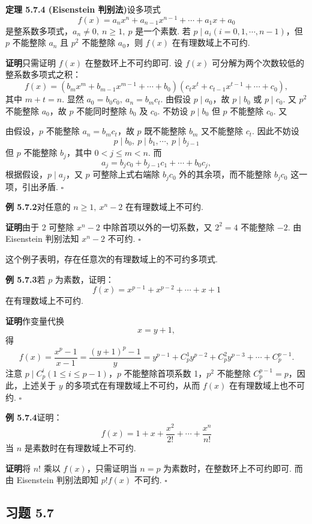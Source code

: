 \documentclass[UTF8,12pt,a4paper,fontset=fandol]{ctexart}
\begin{document}
\noindent\textbf{定理 5.7.4 (Eisenstein 判别法)}\quad 设多项式
\[
f(x)=a_nx^n+a_{n-1}x^{n-1}+\cdots+a_1x+a_0
\]
是整系数多项式，$a_n\neq 0,\ n\geq 1,\ p$ 是一个素数. 若 $p\mid a_i(i=0,1,\cdots,n-1)$，但 $p$ 不能整除 $a_n$ 且 $p^2$ 不能整除 $a_0$，则 $f(x)$ 在有理数域上不可约.

\noindent\textbf{证明}\quad 只需证明 $f(x)$ 在整数环上不可约即可. 设 $f(x)$ 可分解为两个次数较低的整系数多项式之积：
\[
f(x)=(b_mx^m+b_{m-1}x^{m-1}+\cdots+b_0)(c_tx^t+c_{t-1}x^{t-1}+\cdots+c_0),
\]
其中 $m+t=n$. 显然 $a_0=b_0c_0,\ a_n=b_mc_t$. 由假设 $p\mid a_0$，故 $p\mid b_0$ 或 $p\mid c_0$. 又 $p^2$ 不能整除 $a_0$，故 $p$ 不能同时整除 $b_0$ 及 $c_0$. 不妨设 $p\mid b_0$ 但 $p$ 不能整除 $c_0$. 又

由假设，$p$ 不能整除 $a_n=b_mc_t$，故 $p$ 既不能整除 $b_m$ 又不能整除 $c_t$. 因此不妨设
\[
p\mid b_0,\ p\mid b_1,\cdots,\ p\mid b_{j-1}
\]
但 $p$ 不能整除 $b_j$，其中 $0<j\leq m<n$. 而
\[
a_j=b_jc_0+b_{j-1}c_1+\cdots+b_0c_j,
\]
根据假设，$p\mid a_j$，又 $p$ 可整除上式右端除 $b_jc_0$ 外的其余项，而不能整除 $b_jc_0$ 这一项，引出矛盾. $\square$

\noindent\textbf{例 5.7.2}\quad 对任意的 $n\geq 1,\ x^n-2$ 在有理数域上不可约.

\noindent\textbf{证明}\quad 由于 2 可整除 $x^n-2$ 中除首项以外的一切系数，又 $2^2=4$ 不能整除 $-2$. 由 Eisenstein 判别法知 $x^n-2$ 不可约. $\square$

这个例子表明，存在任意次的有理数域上的不可约多项式.

\noindent\textbf{例 5.7.3}\quad 若 $p$ 为素数，证明：
\[
f(x)=x^{p-1}+x^{p-2}+\cdots+x+1
\]
在有理数域上不可约.

\noindent\textbf{证明}\quad 作变量代换
\[
x=y+1,
\]
得
\[
f(x)=\frac{x^p-1}{x-1}=\frac{(y+1)^p-1}{y}
=y^{p-1}+C_p^1y^{p-2}+C_p^2y^{p-3}+\cdots+C_p^{p-1}.
\]
注意 $p\mid C_p^i(1\leq i\leq p-1)$，$p$ 不能整除首项系数 1，$p^2$ 不能整除 $C_p^{p-1}=p$，因此，上述关于 $y$ 的多项式在有理数域上不可约，从而 $f(x)$ 在有理数域上也不可约. $\square$

\noindent\textbf{例 5.7.4}\quad 证明：
\[
f(x)=1+x+\frac{x^2}{2!}+\cdots+\frac{x^n}{n!}
\]
当 $n$ 是素数时在有理数域上不可约.

\noindent\textbf{证明}\quad 将 $n!$ 乘以 $f(x)$，只需证明当 $n=p$ 为素数时，在整数环上不可约即可. 而由 Eisenstein 判别法即知 $p!f(x)$ 不可约. $\square$

\subsection*{习题 5.7}
\end{document}
